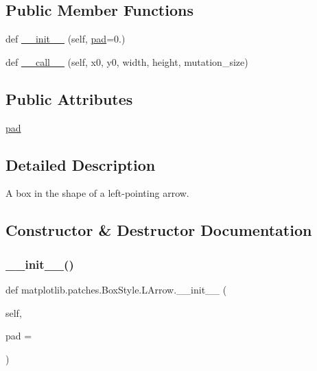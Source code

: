 \subsection*{Public Member Functions}
\begin{DoxyCompactItemize}
\item 
def \hyperlink{classmatplotlib_1_1patches_1_1BoxStyle_1_1LArrow_a25295b5f844c0e6d65a0161e13c59c33}{\+\_\+\+\_\+init\+\_\+\+\_\+} (self, \hyperlink{classmatplotlib_1_1patches_1_1BoxStyle_1_1LArrow_acfe58a098b509c818859f2ecd64309c8}{pad}=0.)
\item 
def \hyperlink{classmatplotlib_1_1patches_1_1BoxStyle_1_1LArrow_a0a13cc9641a873b1da4c4edff129314d}{\+\_\+\+\_\+call\+\_\+\+\_\+} (self, x0, y0, width, height, mutation\+\_\+size)
\end{DoxyCompactItemize}
\subsection*{Public Attributes}
\begin{DoxyCompactItemize}
\item 
\hyperlink{classmatplotlib_1_1patches_1_1BoxStyle_1_1LArrow_acfe58a098b509c818859f2ecd64309c8}{pad}
\end{DoxyCompactItemize}


\subsection{Detailed Description}
\begin{DoxyVerb}A box in the shape of a left-pointing arrow.\end{DoxyVerb}
 

\subsection{Constructor \& Destructor Documentation}
\mbox{\label{classmatplotlib_1_1patches_1_1BoxStyle_1_1LArrow_a25295b5f844c0e6d65a0161e13c59c33}} 
\subsubsection{\texorpdfstring{\+\_\+\+\_\+init\+\_\+\+\_\+()}{\_\_init\_\_()}}
{\footnotesize\ttfamily def matplotlib.\+patches.\+Box\+Style.\+L\+Arrow.\+\_\+\+\_\+init\+\_\+\+\_\+ (\begin{DoxyParamCaption}\item[{}]{self,  }\item[{}]{pad = {} }\end{DoxyParamCaption})}

